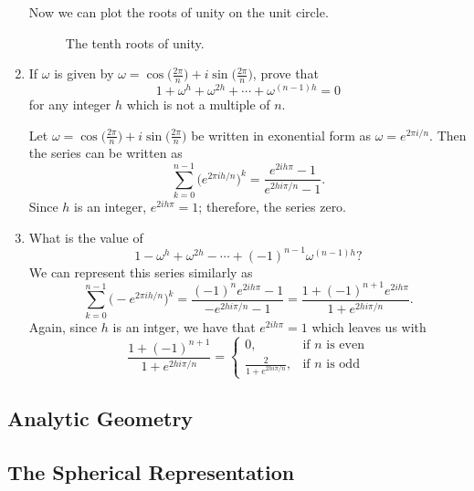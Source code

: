 \begin{enumerate}
  Now we can plot the roots of unity on the unit circle.
  \begin{figure}[H]
    \centering
    
    \caption{The tenth roots of unity.}
  \end{figure}
\item
  If \(\omega\) is given by \(\omega = \cos\bigl(\frac{2\pi}{n}\bigr) +
  i\sin\bigl(\frac{2\pi}{n}\bigr)\), prove that
  \[
  1 + \omega^h + \omega^{2h} + \cdots + \omega^{(n - 1)h} = 0
  \]
  for any integer \(h\) which is not a multiple of \(n\).
  \par\smallskip
  Let \(\omega = \cos\bigl(\frac{2\pi}{n}\bigr) +
  i\sin\bigl(\frac{2\pi}{n}\bigr)\) be written in exonential form as
  \(\omega = e^{2\pi i/n}\).
  Then the series can be written as
  \[
  \sum_{k = 0}^{n - 1}\bigl(e^{2\pi ih/n}\bigr)^k =
  \frac{e^{2ih\pi} - 1}{e^{2hi\pi/n} - 1}.
  \]
  Since \(h\) is an integer, \(e^{2ih\pi} = 1\); therefore, the series zero.
\item
  What is the value of
  \[
  1 - \omega^h + \omega^{2h} - \cdots + (-1)^{n - 1}\omega^{(n - 1)h}\mbox{?}
  \]
  We can represent this series similarly as
  \[
  \sum_{k = 0}^{n - 1}\bigl(-e^{2\pi ih/n}\bigr)^k =
  \frac{(-1)^ne^{2ih\pi} - 1}{-e^{2hi\pi/n} - 1} =
  \frac{1 + (-1)^{n + 1}e^{2ih\pi}}{1 + e^{2hi\pi/n}}.
  \]
  Again, since \(h\) is an intger, we have that \(e^{2ih\pi} = 1\) which leaves
  us with
  \[
  \frac{1 + (-1)^{n + 1}}{1 + e^{2hi\pi/n}} =
  \begin{cases}
    0, & \text{if \(n\) is even}\\
    \frac{2}{1 + e^{2hi\pi/n}}, & \text{if \(n\) is odd}
  \end{cases}
  \]
\end{enumerate}

\subsection{Analytic Geometry}

\subsection{The Spherical Representation}


